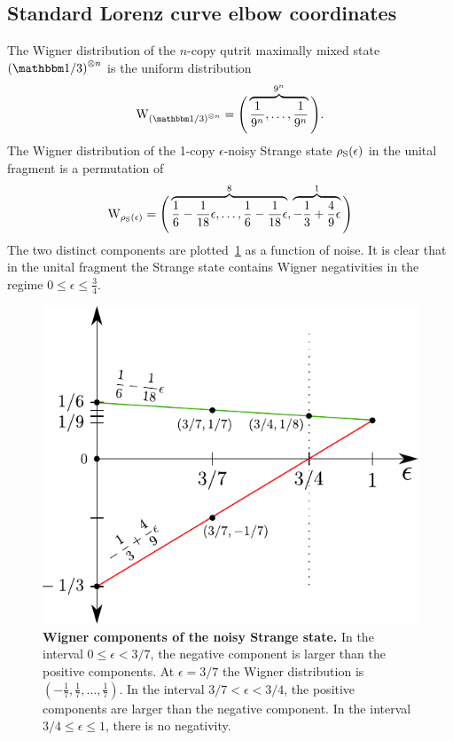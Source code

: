 \subsection{Standard Lorenz curve elbow coordinates}\label{app:lcsu_coord_elb}
The Wigner distribution of the $n$-copy qutrit maximally mixed state $\left(\id/3\right)^{\otimes n}$ is the uniform distribution 
\begin{equation}\label{eq:wu}
	\W{\left(\id/3\right)^{\otimes n}} = \Bigg( \overbrace{\frac{1}{9^n}, \dots, \frac{1}{9^n}}^{9^n} \Bigg).
\end{equation}
The Wigner distribution of the 1-copy $\epsilon$-noisy Strange state $\rho_{\rm{S}}(\epsilon)$ in the unital fragment is a permutation of 
\begin{equation}\label{eq:wsu}
	\W{\rho_{\rm{S}}(\epsilon)} = \Bigg( \overbrace{\frac{1}{6} - \frac{1}{18}\epsilon, \dots, \frac{1}{6} - \frac{1}{18}\epsilon}^8, \overbrace{-\frac{1}{3} + \frac{4}{9}\epsilon}^1 \Bigg)
\end{equation}
The two distinct components are plotted~\cref{fig:noisys} as a function of noise. 
It is clear that in the unital fragment the Strange state contains Wigner negativities in the regime $0 \leq \epsilon \leq \tfrac{3}{4}$.
\begin{figure}[h]
    \centering
    \includegraphics[scale=0.7]{figs/noisys.pdf}
    \caption{\textbf{Wigner components of the noisy Strange state.} 
    In the interval $0 \leq \epsilon < 3/7$, the negative component is larger than the positive components.
    At $\epsilon = 3/7$ the Wigner distribution is $(-\frac{1}{7},\frac{1}{7},\dots,\frac{1}{7})$.
    In the interval $3/7 < \epsilon < 3/4$, the positive components are larger than the negative component.
    In the interval $3/4 \leq \epsilon \leq 1$, there is no negativity.
    }
    \label{fig:noisys}
\end{figure}

